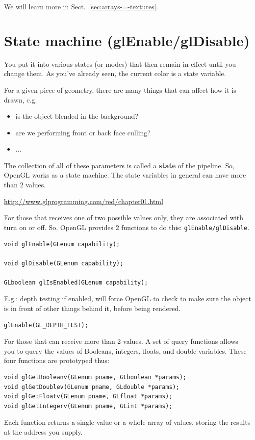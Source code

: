 We will learn more in Sect.~\ref{sec:arrays-=-textures}. 



\section{State machine (glEnable/glDisable)}
\label{sec:state-mach-glen}

You put it into various states (or modes) that then remain in effect until you
change them. As you've already seen, the current color is a state variable. 

For a given piece of geometry, there are many things that can affect
how it is drawn, e.g. 
\begin{itemize}
\item is the object blended in the background?
\item are we performing front or back face culling?
\item ...
\end{itemize}
The collection of all of these parameters is called a {\bf state} of
the pipeline. So, OpenGL works as a state machine. The state variables
in general can have more than 2 values.

\url{http://www.glprogramming.com/red/chapter01.html}

For those that receives one of two possible values only, they are
associated with turn on or off. So, OpenGL provides 2 functions to do
this: \verb!glEnable/glDisable!.
\begin{verbatim}
void glEnable(GLenum capability);

void glDisable(GLenum capability);

GLboolean glIsEnabled(GLenum capability);
\end{verbatim}


E.g.: depth testing if enabled, will force OpenGL to check to make
sure the object is in front of other things behind it, before being
rendered. 
\begin{verbatim}
glEnable(GL_DEPTH_TEST);
\end{verbatim}


For those that can receive more than 2 values. A set of query
functions allows you to query the values of Booleans, integers,
floats, and double variables. These four functions are prototyped
thus:
\begin{verbatim}
void glGetBooleanv(GLenum pname, GLboolean *params);
void glGetDoublev(GLenum pname, GLdouble *params);
void glGetFloatv(GLenum pname, GLfloat *params);
void glGetIntegerv(GLenum pname, GLint *params);
\end{verbatim}
Each function returns a single value or a whole array of values,
storing the results at the address you supply.



